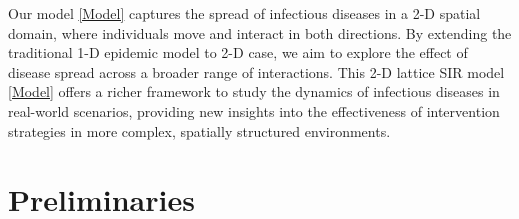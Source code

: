 \documentclass[final,3p,times]{elsarticle}
\numberwithin{equation}{section}
\begin{document}
Our model \eqref{Model} captures the spread of infectious diseases in a 2-D spatial domain, where individuals move and interact in both directions. By extending the traditional 1-D epidemic model \cite{ChenGuoHamelNon2017,ZhangWangLiuJNS2021} to 2-D case, we aim to explore the effect of disease spread across a broader range of interactions. This 2-D lattice SIR model \eqref{Model} offers a richer framework to study the dynamics of infectious diseases in real-world scenarios, providing new insights into the effectiveness of intervention strategies in more complex, spatially structured environments.




\section{Preliminaries }
\end{document}
